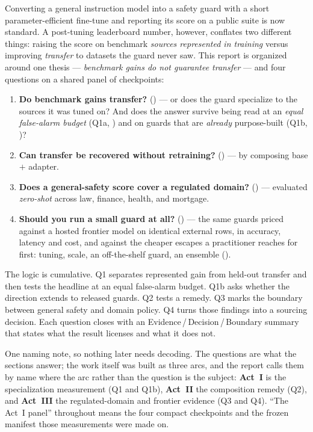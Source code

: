 \documentclass[11pt]{article}
\begin{document}
Converting a general instruction model into a safety guard with a short parameter-efficient fine-tune
\citep{elesedy2024loraguard} and reporting its score on a public suite \citep{bassani2024guardbench}
is now standard. A post-tuning leaderboard number, however, conflates two different things: raising the
score on benchmark \emph{sources represented in training} versus improving \emph{transfer} to datasets
the guard never saw. This report is organized around one thesis --- \emph{benchmark gains do not
guarantee transfer} --- and four questions on a shared panel of checkpoints:
\begin{enumerate}[leftmargin=2.2em,itemsep=1pt,label=\textbf{Q\arabic*.}]
  \item \textbf{Do benchmark gains transfer?} () --- or does the guard specialize to the
  sources it was tuned on? And does the answer survive being read at an \emph{equal false-alarm budget}
  (Q1a, ) and on guards that are \emph{already} purpose-built
  (Q1b, )?
  \item \textbf{Can transfer be recovered without retraining?} () --- by composing base $+$ adapter.
  \item \textbf{Does a general-safety score cover a regulated domain?} () --- evaluated \emph{zero-shot} across law, finance, health, and mortgage.
  \item \textbf{Should you run a small guard at all?} () --- the same guards
  priced against a hosted frontier model on identical external rows, in accuracy, latency and cost, and
  against the cheaper escapes a practitioner reaches for first: tuning, scale, an off-the-shelf guard,
  an ensemble ().
\end{enumerate}
The logic is cumulative. Q1 separates represented gain from held-out transfer and then tests the
headline at an equal false-alarm budget. Q1b asks whether the direction extends to released guards. Q2
tests a remedy. Q3 marks the boundary between general safety and domain policy. Q4 turns those findings
into a sourcing decision. Each question closes with an Evidence\,/\,Decision\,/\,Boundary summary that
states what the result licenses and what it does not.

One naming note, so nothing later needs decoding. The questions are what the sections answer; the work
itself was built as three arcs, and the report calls them by name where the arc rather than the question
is the subject: \textbf{Act~I} is the specialization measurement (Q1 and Q1b), \textbf{Act~II} the
composition remedy (Q2), and \textbf{Act~III} the regulated-domain and frontier evidence (Q3 and Q4).
``The Act~I panel'' throughout means the four compact checkpoints and the frozen manifest those
measurements were made on.
\end{document}

